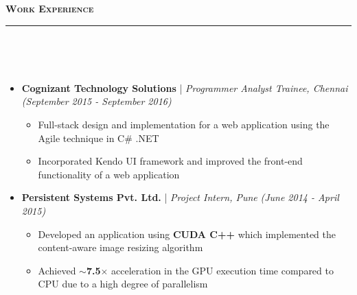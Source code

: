 \documentclass[a4paper,10pt]{article}
\newcommand{\isep}{-2 pt}
\newcommand{\resheading}[1]{{\small
        {
            \begin{minipage}
                {0.992\textwidth}\textbf{{\textsc{#1 \vphantom{p\^{E}} }}}
                \\[-0.3cm]
                \hrule
            \end{minipage}
            \\[-0.5cm]
        }
 }}
\begin{document}
 \vspace{0.05cm}
\resheading{\textbf{\large Work Experience}}\\[-0.4cm]
\begin{itemize}
    \item \textbf{Cognizant Technology Solutions} |
    \emph{Programmer Analyst Trainee, Chennai} \hfill {\emph{(September 2015 - September 2016)}}
    \\ [-0.6cm]
    \begin{itemize}\itemsep \isep
    \item Full-stack design and implementation for a web application using the Agile technique in C\# .NET 
    \item Incorporated Kendo UI framework and improved the front-end functionality of a web application
 \\ [-0.6cm]
    \end{itemize}
    \item \textbf{Persistent Systems Pvt. Ltd.} |
    \emph{Project Intern, Pune} \hfill {\emph{(June 2014 - April 2015)}}
    \\[-0.6cm]
    \begin{itemize}\itemsep \isep
    \item Developed an application  using \textbf{CUDA C++} which implemented the content-aware image resizing algorithm
    \item Achieved \textbf{$\sim$7.5$\times$} acceleration in the GPU execution time compared to CPU due to a high degree of parallelism
    \\ [-0.6cm]
    \end{itemize}
\end{itemize}
\end{document}
